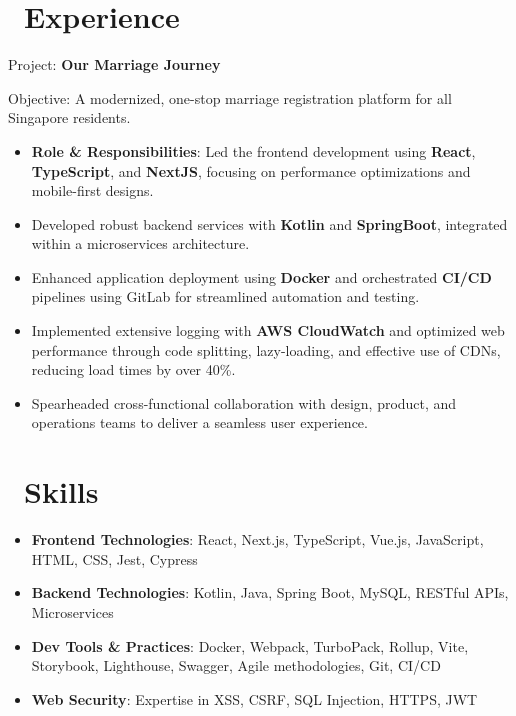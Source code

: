 \documentclass{resume}
\begin{document}
\onehalfspacing
{}



\section{\faUsers\ Experience}

Project: \textbf{Our Marriage Journey}

Objective: A modernized, one-stop marriage registration platform for all Singapore residents.
\begin{itemize}
  \item \textbf{Role \& Responsibilities}: Led the frontend development using \textbf{React}, \textbf{TypeScript}, and \textbf{NextJS}, focusing on performance optimizations and mobile-first designs.
  \item Developed robust backend services with \textbf{Kotlin} and \textbf{SpringBoot}, integrated within a microservices architecture.
  \item Enhanced application deployment using \textbf{Docker} and orchestrated \textbf{CI/CD} pipelines using GitLab for streamlined automation and testing.
  \item Implemented extensive logging with \textbf{AWS CloudWatch} and optimized web performance through code splitting, lazy-loading, and effective use of CDNs, reducing load times by over 40\%.
  \item Spearheaded cross-functional collaboration with design, product, and operations teams to deliver a seamless user experience.
\end{itemize}

\section{\faCogs\ Skills}
\begin{itemize}[parsep=0.5ex]
  \item \textbf{Frontend Technologies}: React, Next.js, TypeScript, Vue.js, JavaScript, HTML, CSS, Jest, Cypress
  \item \textbf{Backend Technologies}: Kotlin, Java, Spring Boot, MySQL, RESTful APIs, Microservices
  \item \textbf{Dev Tools \& Practices}: Docker, Webpack, TurboPack, Rollup, Vite, Storybook, Lighthouse, Swagger, Agile methodologies, Git, CI/CD
  \item \textbf{Web Security}: Expertise in XSS, CSRF, SQL Injection, HTTPS, JWT
\end{itemize}
\end{document}
